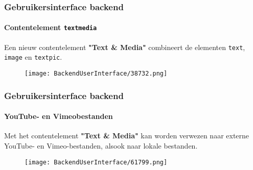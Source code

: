 \begin{frame}[fragile]
	\frametitle{Gebruikersinterface backend}
	\framesubtitle{Contentelement \texttt{textmedia}}

	Een nieuw contentelement \textbf{"Text \& Media"} combineert de elementen
	\texttt{text}, \texttt{image} en \texttt{textpic}.

	\begin{figure}
		\texttt{[image: BackendUserInterface/38732.png]}
	\end{figure}

\end{frame}

\begin{frame}[fragile]
	\frametitle{Gebruikersinterface backend}
	\framesubtitle{YouTube- en Vimeobestanden}

	Met het contentelement \textbf{"Text \& Media"} kan worden verwezen naar externe
	YouTube- en Vimeo-bestanden, alsook naar lokale bestanden.

	\begin{figure}
		\texttt{[image: BackendUserInterface/61799.png]}
	\end{figure}

\end{frame}

